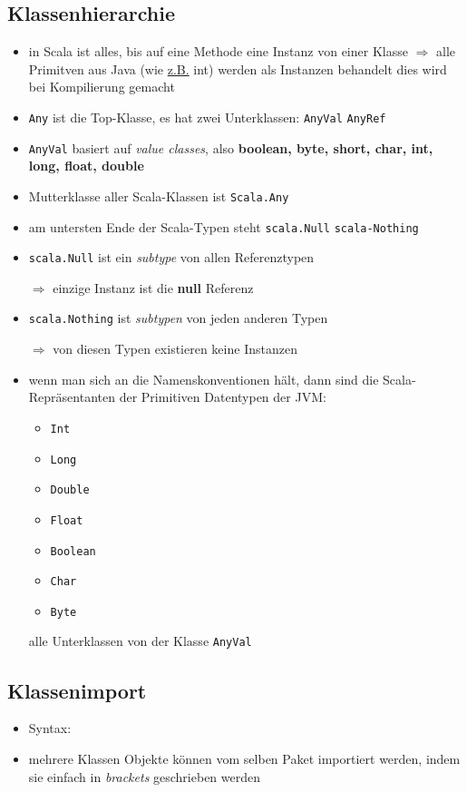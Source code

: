 \subsection{Klassenhierarchie}
\begin{itemize}
  \item in Scala ist alles, bis auf eine Methode eine Instanz von
  einer Klasse $\Rightarrow$ alle Primitven aus Java (wie \uline{z.B.} int) 
  werden als Instanzen behandelt \und dies wird bei Kompilierung gemacht
  \item \texttt{Any} ist die Top-Klasse, es hat zwei Unterklassen:
  \texttt{AnyVal} \und \texttt{AnyRef}
  \item \texttt{AnyVal}  basiert auf \textit{value classes}, also
  \textbf{boolean, byte, short, char, int, long, float, double}
  \item Mutterklasse aller Scala-Klassen ist \texttt{Scala.Any}
  \item am untersten Ende der Scala-Typen steht \texttt{scala.Null}
  \und \texttt{scala-Nothing}
  \item \texttt{scala.Null} ist ein \textit{subtype} von allen Referenztypen
  
  $\Rightarrow$ einzige Instanz ist die \textbf{null} Referenz
  \item \texttt{scala.Nothing} ist \textit{subtypen} von jeden anderen Typen
  
  $\Rightarrow$ von diesen Typen existieren keine Instanzen
  \item wenn man sich an die Namenskonventionen hält, dann sind
  die Scala-Repräsentanten der Primitiven Datentypen der JVM:
  \begin{itemize}
    \item \texttt{Int}
    \item \texttt{Long}
    \item \texttt{Double}
    \item \texttt{Float}
    \item \texttt{Boolean}
    \item \texttt{Char}
    \item \texttt{Byte}
  \end{itemize} 
  
  alle Unterklassen von der Klasse \texttt{AnyVal}
\end{itemize}


\subsection{Klassenimport}
\begin{itemize}
  \item Syntax:
  
  
  
  \item mehrere Klassen \oder Objekte können vom selben Paket importiert werden, 
  indem sie einfach in \textit{brackets} geschrieben werden
\end{itemize}


